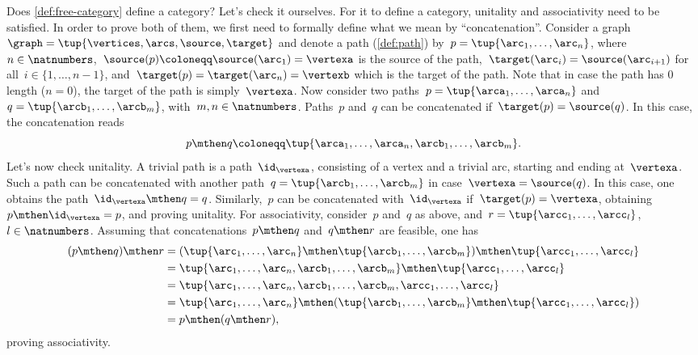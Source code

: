 Does \cref{def:free-category} define a category?
Let's check it ourselves.
For it to define a category, unitality and associativity need to be satisfied.
In order to prove both of them, we first need to formally define what we mean by ``concatenation''.
Consider a graph~$\graph=\tup{\vertices,\arcs,\source,\target}$ and denote a path (\cref{def:path}) by~$p=\tup{\arc_1,\ldots, \arc_n}$, where~$n\in \natnumbers$,~$\source(p)\coloneqq\source(\arc_1)=\vertexa$ is the source of the path,~$\target(\arc_i)=\source(\arc_{i+1})$ for all~$i\in \{1,\ldots,n-1\}$, and~$\target(p)=\target(\arc_n)=\vertexb$ which is the target of the path.
Note that in case the path has 0 length ($n=0$), the target of the path is simply~$\vertexa$.
Now consider two paths~$p=\tup{\arca_1,\ldots,\arca_n}$ and~$q=\tup{\arcb_1,\ldots,\arcb_m}$, with~$m,n\in \natnumbers$.
Paths~$p$ and~$q$ can be concatenated if~$\target(p)=\source(q)$.
In this case, the concatenation reads
%
\begin{equation*}
	p\mthen q\coloneqq \tup{\arca_1,\ldots, \arca_n,\arcb_1,\ldots,\arcb_m}.
\end{equation*}
%
Let's now check unitality.
A trivial path is a path~$\id_\vertexa$, consisting of a vertex and a trivial arc, starting and ending at~$\vertexa$.
Such a path can be concatenated with another path~$q=\tup{\arcb_1,\ldots,\arcb_m}$ in case~$\vertexa=\source(q)$.
In this case, one obtains the path~$\id_\vertexa \mthen q=q$.
Similarly,~$p$ can be concatenated with~$\id_\vertexa$ if~$\target(p)=\vertexa$, obtaining~$p\mthen \id_\vertexa=p$, and proving unitality.
For associativity, consider~$p$ and~$q$ as above, and~$r=\tup{\arcc_1,\ldots,\arcc_l}$,~$l\in \natnumbers$.
Assuming that concatenations~$p\mthen q$ and~$q\mthen r$ are feasible, one has
\begin{equation*}
	\begin{aligned}
		(p\mthen q)\mthen r & =(\tup{\arc_1,\ldots, \arc_n}\mthen \tup{\arcb_1,\ldots,\arcb_m})\mthen \tup{\arcc_1,\ldots,\arcc_l}  \\
		                    & =\tup{\arc_1,\ldots, \arc_n,\arcb_1,\ldots,\arcb_m}\mthen \tup{\arcc_1,\ldots,\arcc_l}                \\
		                    & = \tup{\arc_1,\ldots, \arc_n,\arcb_1,\ldots,\arcb_m, \arcc_1,\ldots,\arcc_l}                          \\
		                    & =\tup{\arc_1,\ldots, \arc_n} \mthen (\tup{\arcb_1,\ldots,\arcb_m}\mthen \tup{\arcc_1,\ldots,\arcc_l}) \\
		                    & =p\mthen (q\mthen r),
	\end{aligned}
\end{equation*}
proving associativity.

